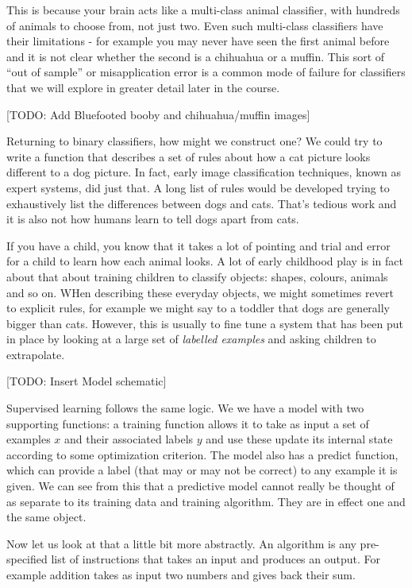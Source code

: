 \documentclass[
]{book}
\theoremstyle{definition}
\theoremstyle{definition}
\theoremstyle{definition}
\theoremstyle{definition}
\theoremstyle{remark}
\begin{document}
This is because your brain acts like a multi-class animal classifier, with hundreds of animals to choose from, not just two. Even such multi-class classifiers have their limitations - for example you may never have seen the first animal before and it is not clear whether the second is a chihuahua or a muffin. This sort of ``out of sample'' or misapplication error is a common mode of failure for classifiers that we will explore in greater detail later in the course.

{[}TODO: Add Bluefooted booby and chihuahua/muffin images{]}

Returning to binary classifiers, how might we construct one? We could try to write a function that describes a set of rules about how a cat picture looks different to a dog picture. In fact, early image classification techniques, known as expert systems, did just that. A long list of rules would be developed trying to exhaustively list the differences between dogs and cats. That's tedious work and it is also not how humans learn to tell dogs apart from cats.

If you have a child, you know that it takes a lot of pointing and trial and error for a child to learn how each animal looks. A lot of early childhood play is in fact about that about training children to classify objects: shapes, colours, animals and so on. WHen describing these everyday objects, we might sometimes revert to explicit rules, for example we might say to a toddler that dogs are generally bigger than cats. However, this is usually to fine tune a system that has been put in place by looking at a large set of \emph{labelled examples} and asking children to extrapolate.

{[}TODO: Insert Model schematic{]}

Supervised learning follows the same logic. We we have a model with two supporting functions: a training function allows it to take as input a set of examples \(x\) and their associated labels \(y\) and use these update its internal state according to some optimization criterion. The model also has a predict function, which can provide a label (that may or may not be correct) to any example it is given. We can see from this that a predictive model cannot really be thought of as separate to its training data and training algorithm. They are in effect one and the same object.

Now let us look at that a little bit more abstractly. An algorithm is any pre-specified list of instructions that takes an input and produces an output. For example addition takes as input two numbers and gives back their sum.
\end{document}
